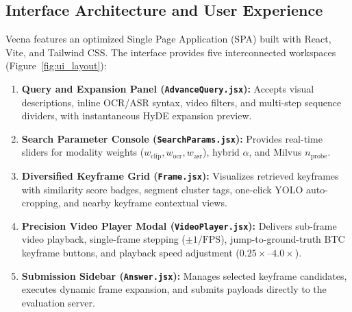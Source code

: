 \documentclass[10pt,a4paper,twocolumn]{article}
\begin{document}
\subsection{Interface Architecture and User Experience}
Vecna features an optimized Single Page Application (SPA) built with React, Vite, and Tailwind CSS. The interface provides five interconnected workspaces (Figure~\ref{fig:ui_layout}):
\begin{enumerate}
    \item \textbf{Query and Expansion Panel (\texttt{AdvanceQuery.jsx}):} Accepts visual descriptions, inline OCR/ASR syntax, video filters, and multi-step sequence dividers, with instantaneous HyDE expansion preview.
    \item \textbf{Search Parameter Console (\texttt{SearchParams.jsx}):} Provides real-time sliders for modality weights ($w_{\text{clip}}, w_{\text{ocr}}, w_{\text{asr}}$), hybrid $\alpha$, and Milvus $n_{\text{probe}}$.
    \item \textbf{Diversified Keyframe Grid (\texttt{Frame.jsx}):} Visualizes retrieved keyframes with similarity score badges, segment cluster tags, one-click YOLO auto-cropping, and nearby keyframe contextual views.
    \item \textbf{Precision Video Player Modal (\texttt{VideoPlayer.jsx}):} Delivers sub-frame video playback, single-frame stepping ($\pm 1/\text{FPS}$), jump-to-ground-truth BTC keyframe buttons, and playback speed adjustment ($0.25\times$--$4.0\times$).
    \item \textbf{Submission Sidebar (\texttt{Answer.jsx}):} Manages selected keyframe candidates, executes dynamic frame expansion, and submits payloads directly to the evaluation server.
\end{enumerate}
\end{document}
